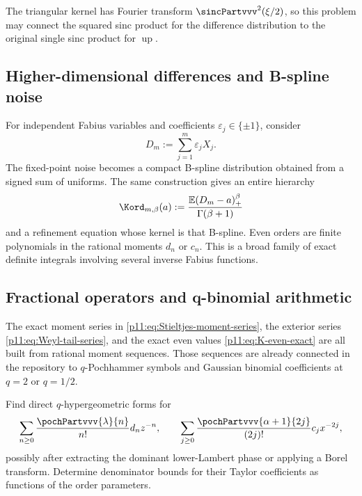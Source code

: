 \documentclass[11pt,oneside]{article}
\theoremstyle{definition}
\theoremstyle{remark}
\newcommand{\Up}{\operatorname{up}}
\newcommand{\E}{\mathbb E}
\newcommand{\1}{\mathbf 1}
\begin{document}
The triangular kernel has Fourier transform
$\sincPartvvv^2(\xi/2)$, so this problem may connect the squared sinc product for the
difference distribution to the original single sinc product for $\Up$.

\subsection{Higher-dimensional differences and B-spline noise}

For independent Fabius variables and coefficients $\varepsilon_j\in\{\pm1\}$,
consider
\begin{equation}
 D_m:=\sum_{j=1}^{m}\varepsilon_jX_j.
\end{equation}
The fixed-point noise becomes a compact B-spline distribution obtained from a
signed sum of uniforms.  The same construction gives an entire hierarchy
\begin{equation}
 \Kord_{m,\beta}(a)
 :=\frac{\E(D_m-a)_+^\beta}{\Gamma(\beta+1)}
\end{equation}
and a refinement equation whose kernel is that B-spline.  Even orders are
finite polynomials in the rational moments $d_n$ or $c_n$.  This is a broad
family of exact definite integrals involving several inverse Fabius
functions.

\subsection{Fractional operators and q-binomial arithmetic}

The exact moment series in \eqref{p11:eq:Stieltjes-moment-series}, the exterior
series \eqref{p11:eq:Weyl-tail-series}, and the exact even values
\eqref{p11:eq:K-even-exact} are all built from rational moment sequences.  Those
sequences are already connected in the repository to $q$-Pochhammer symbols
and Gaussian binomial coefficients at $q=2$ or $q=1/2$.

\begin{problem}
Find direct $q$-hypergeometric forms for
\begin{equation}
 \sum_{n\ge0}\frac{\pochPartvvv{\lambda}{n}}{n!}d_nz^{-n},
 \qquad
 \sum_{j\ge0}\frac{\pochPartvvv{\alpha+1}{2j}}{(2j)!}c_jx^{-2j},
\end{equation}
possibly after extracting the dominant lower-Lambert phase or applying a
Borel transform.  Determine denominator bounds for their Taylor
coefficients as functions of the order parameters.
\end{problem}
\end{document}
